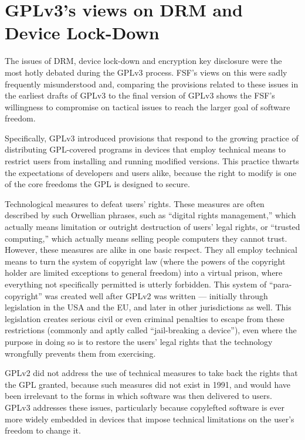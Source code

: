 \section{GPLv3's views on DRM and Device Lock-Down}
\label{GPLv3-drm}

The issues of DRM, device lock-down and encryption key disclosure were the
most hotly debated during the GPLv3 process.  FSF's views on this were sadly
frequently misunderstood and, comparing the provisions related to these
issues in the earliest drafts of GPLv3 to  the final version of GPLv3 shows
the FSF's willingness to compromise on tactical issues to reach the larger
goal of software freedom.

Specifically, GPLv3 introduced provisions that respond to the growing
practice of distributing GPL-covered programs in devices that employ
technical means to restrict users from installing and running modified
versions.  This practice thwarts the expectations of developers and users
alike, because the right to modify is one of the core freedoms the GPL is
designed to secure.

Technological measures to defeat users' rights.  These measures are often
described by such Orwellian phrases, such as ``digital rights management,''
which actually means limitation or outright destruction of users' legal
rights, or ``trusted computing,'' which actually means selling people
computers they cannot trust.  However, these measures are alike in one basic
respect.  They all employ technical means to turn the system of copyright law
(where the powers of the copyright holder are limited exceptions to general
freedom) into a virtual prison, where everything not specifically permitted
is utterly forbidden.  This system of ``para-copyright'' was created well
after GPLv2 was written --- initially through legislation in the USA and the
EU, and later in other jurisdictions as well.  This legislation creates
serious civil or even criminal penalties to escape from these restrictions
(commonly and aptly called ``jail-breaking a device''), even where the
purpose in doing so is to restore the users' legal rights that the technology
wrongfully prevents them from exercising.

GPLv2 did not address the use of technical measures to take back the rights
that the GPL granted, because such measures did not exist in 1991, and would
have been irrelevant to the forms in which software was then delivered to
users.  GPLv3 addresses these issues, particularly because copylefted
software is ever more widely embedded in devices that impose technical
limitations on the user's freedom to change it.

